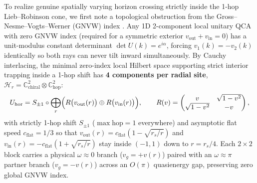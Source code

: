 To realize genuine spatially varying horizon crossing strictly inside the 1-hop Lieb--Robinson cone, we first note a
topological obstruction from the Gross--Nesme--Vogts--Werner (GNVW) index \cite{gross2012gnvw}. Any 1D 2-component
local unitary QCA with zero GNVW index (required for a symmetric exterior $v_{\mathrm{out}} + v_{\mathrm{in}} = 0$)
has a unit-modulus constant determinant $\det U(k) = e^{i\alpha}$, forcing $v_1(k) = -v_2(k)$ identically so both rays
can never tilt inward simultaneously. By Cauchy interlacing, the minimal zero-index local Hilbert space supporting
strict interior trapping inside a 1-hop shift has \textbf{4 components per radial site},
$\mathcal{H}_r = \mathbb{C}^2_{\mathrm{chiral}} \otimes \mathbb{C}^2_{\mathrm{hop}}$:
\begin{equation}
U_{\mathrm{hor}} = S_{\pm 1} \circ \bigoplus_{r} \Bigl(R\bigl(v_{\mathrm{out}}(r)\bigr) \oplus R\bigl(v_{\mathrm{in}}(r)\bigr)\Bigr),
\qquad
R(v) = \begin{pmatrix} v & \sqrt{1 - v^2} \\ \sqrt{1 - v^2} & -v \end{pmatrix},
\label{eq:horizon-1hop}
\end{equation}
with strictly 1-hop shift $S_{\pm 1}$ ($\max\text{hop} = 1$ everywhere) and asymptotic flat speed $c_{\mathrm{flat}} = 1/3$
so that $v_{\mathrm{out}}(r) = c_{\mathrm{flat}}(1 - \sqrt{r_s/r})$ and
$v_{\mathrm{in}}(r) = -c_{\mathrm{flat}}(1 + \sqrt{r_s/r})$ stay inside $(-1, 1)$ down to $r = r_s/4$. Each $2 \times 2$
block carries a physical $\omega \approx 0$ branch ($v_g = +v(r)$) paired with an $\omega \approx \pi$ partner branch
($v_g = -v(r)$) across an $O(\pi)$ quasienergy gap, preserving zero global GNVW index.

